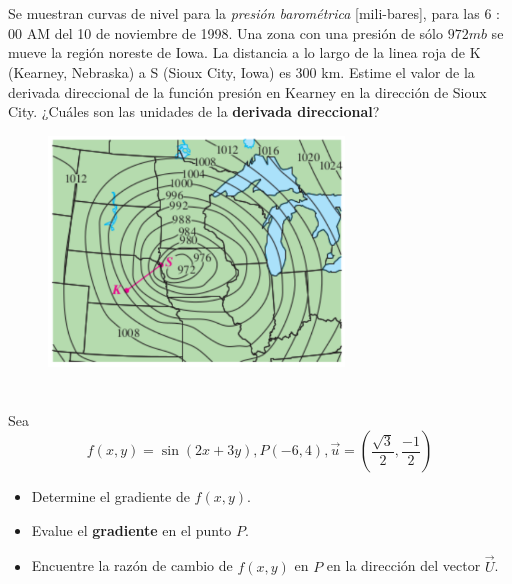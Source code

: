 \documentclass[12pt]{article}
\begin{document}
\section{}

Se muestran curvas de nivel para la \textit{presión barométrica} [mili-bares], para las 6 : 00 AM del 10 de noviembre de 1998. Una zona con una presión de
sólo $972 mb$ se mueve la región noreste de Iowa. La distancia a lo largo de la linea roja de K (Kearney, Nebraska) a S (Sioux City, Iowa) es 300 km. Estime el valor de la derivada direccional de la función presión en Kearney en la dirección de Sioux City. ¿Cuáles son las unidades de la \textbf{derivada
  direccional}?

\begin{figure}[H]
  \centering
  \includegraphics[width=0.7\textwidth]{./img/t3_ej12.png}
\end{figure}

\section{}

Sea $$f(x, y) = \sin{(2x + 3y)}, P(-6, 4), \vec{u}=\left(\frac{\sqrt{3}}{2},\frac{-1}{2} \right)$$

\begin{itemize}[format=\textbf]

\item Determine el gradiente de $f(x, y)$.

\item Evalue el \textbf{gradiente} en el punto $P$.

\item Encuentre la razón de cambio de $f(x, y)$ en $P$ en la dirección del vector $\vec{U}$.

\end{itemize}
\end{document}
